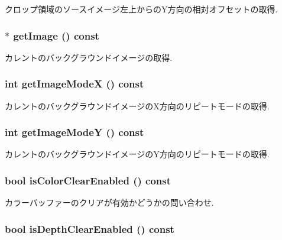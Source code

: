 クロップ領域のソースイメージ左上からのY方向の相対オフセットの取得. \hypertarget{classm3g_1_1Background_a8c0193b0e7d47d4b5c9f60df24c44f5}{
\subsubsection[{getImage}]{ $\ast$ getImage () const}}
\label{classm3g_1_1Background_a8c0193b0e7d47d4b5c9f60df24c44f5}


カレントのバックグラウンドイメージの取得. \hypertarget{classm3g_1_1Background_0dd60d498f4d50d8808c0b3ad61bc9e8}{
\subsubsection[{getImageModeX}]{\setlength{\rightskip}{0pt plus 5cm}int getImageModeX () const}}
\label{classm3g_1_1Background_0dd60d498f4d50d8808c0b3ad61bc9e8}


カレントのバックグラウンドイメージのX方向のリピートモードの取得. \hypertarget{classm3g_1_1Background_a8d38d66f133ae417956a5dc5f84551d}{
\subsubsection[{getImageModeY}]{\setlength{\rightskip}{0pt plus 5cm}int getImageModeY () const}}
\label{classm3g_1_1Background_a8d38d66f133ae417956a5dc5f84551d}


カレントのバックグラウンドイメージのY方向のリピートモードの取得. \hypertarget{classm3g_1_1Background_d6b7bfdf4225b509549e2fbb9575b509}{
\subsubsection[{isColorClearEnabled}]{\setlength{\rightskip}{0pt plus 5cm}bool isColorClearEnabled () const}}
\label{classm3g_1_1Background_d6b7bfdf4225b509549e2fbb9575b509}


カラーバッファーのクリアが有効かどうかの問い合わせ. \hypertarget{classm3g_1_1Background_d20a03183cd1c6418dcadf94ac0ca470}{
\subsubsection[{isDepthClearEnabled}]{\setlength{\rightskip}{0pt plus 5cm}bool isDepthClearEnabled () const}}
\label{classm3g_1_1Background_d20a03183cd1c6418dcadf94ac0ca470}


